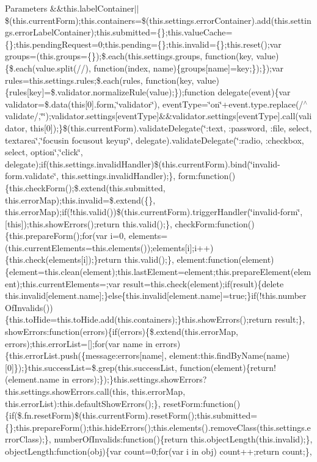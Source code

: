 \begin{DoxyParams}{Parameters}
\&\&this.\+label\+Container$\vert$$\vert$\$(this.\+current\+Form);this.\+containers=\$(this.\+settings.\+error\+Container).add(this.\+settings.\+error\+Label\+Container);this.\+submitted=\{\};this.\+value\+Cache=\{\};this.\+pending\+Request=0;this.\+pending=\{\};this.\+invalid=\{\};this.\+reset();var groups=(this.\+groups=\{\});\$.each(this.\+settings.\+groups, function(key, value)\{\$.each(value.\+split(//), function(index, name)\{groups\mbox{[}name\mbox{]}=key;\});\});var rules=this.\+settings.\+rules;\$.each(rules, function(key, value)\{rules\mbox{[}key\mbox{]}=\$.validator.\+normalize\+Rule(value);\});function delegate(event)\{var validator=\$.data(this\mbox{[}0\mbox{]}.form,\char`\"{}validator\char`\"{}), event\+Type=\char`\"{}on\char`\"{}+event.type.\+replace(/$^\wedge$validate/,\char`\"{}\char`\"{});validator.\+settings\mbox{[}event\+Type\mbox{]}\&\&validator.\+settings\mbox{[}event\+Type\mbox{]}.call(validator, this\mbox{[}0\mbox{]});\}\$(this.\+current\+Form).validate\+Delegate(\char`\"{}\+:text, \+:password, \+:file, select, textarea\char`\"{},\char`\"{}focusin focusout keyup\char`\"{}, delegate).validate\+Delegate(\char`\"{}\+:radio, \+:checkbox, select, option\char`\"{},\char`\"{}click\char`\"{}, delegate);if(this.\+settings.\+invalid\+Handler)\$(this.\+current\+Form).bind(\char`\"{}invalid-\/form.\+validate\char`\"{}, this.\+settings.\+invalid\+Handler);\}, form\+:function()\{this.\+check\+Form();\$.extend(this.\+submitted, this.\+error\+Map);this.\+invalid=\$.extend(\{\}, this.\+error\+Map);if(!this.valid())\$(this.\+current\+Form).trigger\+Handler(\char`\"{}invalid-\/form\char`\"{}, \mbox{[}this\mbox{]});this.\+show\+Errors();return this.\+valid();\}, check\+Form\+:function()\{this.\+prepare\+Form();for(var i=0, elements=(this.\+current\+Elements=this.\+elements());elements\mbox{[}i\mbox{]};i++)\{this.\+check(elements\mbox{[}i\mbox{]});\}return this.\+valid();\}, element\+:function(element)\{element=this.\+clean(element);this.\+last\+Element=element;this.\+prepare\+Element(element);this.\+current\+Elements=;var result=this.\+check(element);if(result)\{delete this.\+invalid\mbox{[}element.\+name\mbox{]};\}else\{this.\+invalid\mbox{[}element.\+name\mbox{]}=true;\}if(!this.number\+Of\+Invalids())\{this.\+to\+Hide=this.\+to\+Hide.\+add(this.\+containers);\}this.\+show\+Errors();return result;\}, show\+Errors\+:function(errors)\{if(errors)\{\$.extend(this.\+error\+Map, errors);this.\+error\+List=\mbox{[}\mbox{]};for(var name in errors)\{this.\+error\+List.\+push(\{message\+:errors\mbox{[}name\mbox{]}, element\+:this.\+find\+By\+Name(name)\mbox{[}0\mbox{]}\});\}this.\+success\+List=\$.grep(this.\+success\+List, function(element)\{return!(element.\+name in errors);\});\}this.\+settings.\+show\+Errors?this.\+settings.\+show\+Errors.\+call(this, this.\+error\+Map, this.\+error\+List)\+:this.\+default\+Show\+Errors();\}, reset\+Form\+:function()\{if(\$.fn.\+reset\+Form)\$(this.\+current\+Form).reset\+Form();this.\+submitted=\{\};this.\+prepare\+Form();this.\+hide\+Errors();this.\+elements().remove\+Class(this.\+settings.\+error\+Class);\}, number\+Of\+Invalids\+:function()\{return this.\+object\+Length(this.\+invalid);\}, object\+Length\+:function(obj)\{var count=0;for(var i in obj) count++;return count;\}, 
\end{DoxyParams}
